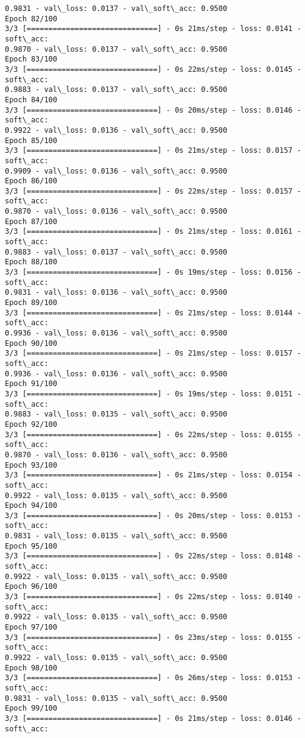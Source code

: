 \documentclass[11pt]{article}
\begin{document}
\begin{Verbatim}[commandchars=\\\{\}]
0.9831 - val\_loss: 0.0137 - val\_soft\_acc: 0.9500
Epoch 82/100
3/3 [==============================] - 0s 21ms/step - loss: 0.0141 - soft\_acc:
0.9870 - val\_loss: 0.0137 - val\_soft\_acc: 0.9500
Epoch 83/100
3/3 [==============================] - 0s 22ms/step - loss: 0.0145 - soft\_acc:
0.9883 - val\_loss: 0.0137 - val\_soft\_acc: 0.9500
Epoch 84/100
3/3 [==============================] - 0s 20ms/step - loss: 0.0146 - soft\_acc:
0.9922 - val\_loss: 0.0136 - val\_soft\_acc: 0.9500
Epoch 85/100
3/3 [==============================] - 0s 21ms/step - loss: 0.0157 - soft\_acc:
0.9909 - val\_loss: 0.0136 - val\_soft\_acc: 0.9500
Epoch 86/100
3/3 [==============================] - 0s 22ms/step - loss: 0.0157 - soft\_acc:
0.9870 - val\_loss: 0.0136 - val\_soft\_acc: 0.9500
Epoch 87/100
3/3 [==============================] - 0s 21ms/step - loss: 0.0161 - soft\_acc:
0.9883 - val\_loss: 0.0137 - val\_soft\_acc: 0.9500
Epoch 88/100
3/3 [==============================] - 0s 19ms/step - loss: 0.0156 - soft\_acc:
0.9831 - val\_loss: 0.0136 - val\_soft\_acc: 0.9500
Epoch 89/100
3/3 [==============================] - 0s 21ms/step - loss: 0.0144 - soft\_acc:
0.9936 - val\_loss: 0.0136 - val\_soft\_acc: 0.9500
Epoch 90/100
3/3 [==============================] - 0s 21ms/step - loss: 0.0157 - soft\_acc:
0.9936 - val\_loss: 0.0136 - val\_soft\_acc: 0.9500
Epoch 91/100
3/3 [==============================] - 0s 19ms/step - loss: 0.0151 - soft\_acc:
0.9883 - val\_loss: 0.0135 - val\_soft\_acc: 0.9500
Epoch 92/100
3/3 [==============================] - 0s 22ms/step - loss: 0.0155 - soft\_acc:
0.9870 - val\_loss: 0.0136 - val\_soft\_acc: 0.9500
Epoch 93/100
3/3 [==============================] - 0s 21ms/step - loss: 0.0154 - soft\_acc:
0.9922 - val\_loss: 0.0135 - val\_soft\_acc: 0.9500
Epoch 94/100
3/3 [==============================] - 0s 20ms/step - loss: 0.0153 - soft\_acc:
0.9831 - val\_loss: 0.0135 - val\_soft\_acc: 0.9500
Epoch 95/100
3/3 [==============================] - 0s 22ms/step - loss: 0.0148 - soft\_acc:
0.9922 - val\_loss: 0.0135 - val\_soft\_acc: 0.9500
Epoch 96/100
3/3 [==============================] - 0s 22ms/step - loss: 0.0140 - soft\_acc:
0.9922 - val\_loss: 0.0135 - val\_soft\_acc: 0.9500
Epoch 97/100
3/3 [==============================] - 0s 23ms/step - loss: 0.0155 - soft\_acc:
0.9922 - val\_loss: 0.0135 - val\_soft\_acc: 0.9500
Epoch 98/100
3/3 [==============================] - 0s 26ms/step - loss: 0.0153 - soft\_acc:
0.9831 - val\_loss: 0.0135 - val\_soft\_acc: 0.9500
Epoch 99/100
3/3 [==============================] - 0s 21ms/step - loss: 0.0146 - soft\_acc:

\end{Verbatim}
\end{document}
